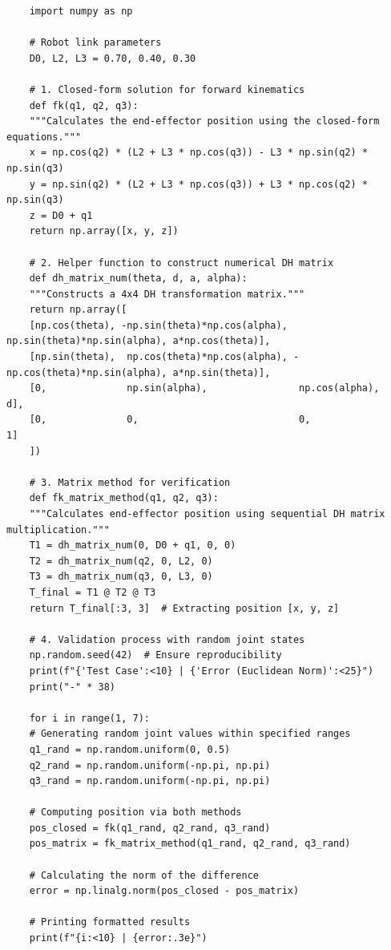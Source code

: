 \documentclass{article}
\begin{document}
\begin{latin}
\begin{LTR}
\begin{verbatim}
	import numpy as np
	
	# Robot link parameters
	D0, L2, L3 = 0.70, 0.40, 0.30
	
	# 1. Closed-form solution for forward kinematics
	def fk(q1, q2, q3):
	"""Calculates the end-effector position using the closed-form equations."""
	x = np.cos(q2) * (L2 + L3 * np.cos(q3)) - L3 * np.sin(q2) * np.sin(q3)
	y = np.sin(q2) * (L2 + L3 * np.cos(q3)) + L3 * np.cos(q2) * np.sin(q3)
	z = D0 + q1
	return np.array([x, y, z])
	
	# 2. Helper function to construct numerical DH matrix
	def dh_matrix_num(theta, d, a, alpha):
	"""Constructs a 4x4 DH transformation matrix."""
	return np.array([
	[np.cos(theta), -np.sin(theta)*np.cos(alpha),  np.sin(theta)*np.sin(alpha), a*np.cos(theta)],
	[np.sin(theta),  np.cos(theta)*np.cos(alpha), -np.cos(theta)*np.sin(alpha), a*np.sin(theta)],
	[0,              np.sin(alpha),                np.cos(alpha),               d],
	[0,              0,                            0,                           1]
	])
	
	# 3. Matrix method for verification
	def fk_matrix_method(q1, q2, q3):
	"""Calculates end-effector position using sequential DH matrix multiplication."""
	T1 = dh_matrix_num(0, D0 + q1, 0, 0)
	T2 = dh_matrix_num(q2, 0, L2, 0)
	T3 = dh_matrix_num(q3, 0, L3, 0)
	T_final = T1 @ T2 @ T3
	return T_final[:3, 3]  # Extracting position [x, y, z]
	
	# 4. Validation process with random joint states
	np.random.seed(42)  # Ensure reproducibility
	print(f"{'Test Case':<10} | {'Error (Euclidean Norm)':<25}")
	print("-" * 38)
	
	for i in range(1, 7):
	# Generating random joint values within specified ranges
	q1_rand = np.random.uniform(0, 0.5)
	q2_rand = np.random.uniform(-np.pi, np.pi)
	q3_rand = np.random.uniform(-np.pi, np.pi)
	
	# Computing position via both methods
	pos_closed = fk(q1_rand, q2_rand, q3_rand)
	pos_matrix = fk_matrix_method(q1_rand, q2_rand, q3_rand)
	
	# Calculating the norm of the difference
	error = np.linalg.norm(pos_closed - pos_matrix)
	
	# Printing formatted results
	print(f"{i:<10} | {error:.3e}")	
\end{verbatim}
\end{LTR}
\end{latin}
\end{document}
